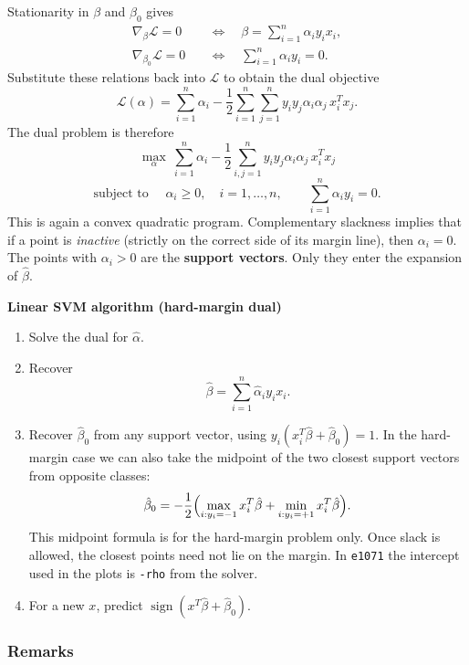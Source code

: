 \documentclass[
]{book}
\providecommand{\tightlist}{%
  \setlength{\itemsep}{0pt}\setlength{\parskip}{0pt}}
\begin{document}
Stationarity in \(\beta\) and \(\beta_0\) gives
\begin{align*}
\nabla_{\beta}\mathcal{L}=0
&\quad\Leftrightarrow\quad
\beta = \sum_{i=1}^{n}\alpha_i y_i x_i,\\
\nabla_{\beta_0}\mathcal{L}=0
&\quad\Leftrightarrow\quad
\sum_{i=1}^{n}\alpha_i y_i = 0.
\end{align*}
Substitute these relations back into \(\mathcal{L}\) to obtain the dual objective
\[
\mathcal{L}(\alpha)
= \sum_{i=1}^{n}\alpha_i
- \frac12\sum_{i=1}^{n}\sum_{j=1}^{n} y_i y_j\alpha_i\alpha_j\, x_i^T x_j.
\]
The dual problem is therefore
\[
\max_{\alpha}\
\sum_{i=1}^{n}\alpha_i
- \frac12\sum_{i,j=1}^{n} y_i y_j\alpha_i\alpha_j\, x_i^T x_j
\]
\[
\text{subject to }\quad
\alpha_i\ge 0,\quad i=1,\ldots,n,
\qquad
\sum_{i=1}^{n}\alpha_i y_i=0.
\]
This is again a convex quadratic program. Complementary slackness implies that if a point is \emph{inactive} (strictly on the correct side of its margin line), then \(\alpha_i=0\). The points with \(\alpha_i>0\) are the \textbf{support vectors}. Only they enter the expansion of \(\hat\beta\).

\textbf{Linear SVM algorithm (hard-margin dual)}

\begin{enumerate}
\def\labelenumi{\arabic{enumi}.}
\tightlist
\item
  Solve the dual for \(\hat\alpha\).
\item
  Recover
  \[
  \hat\beta = \sum_{i=1}^{n}\hat\alpha_i y_i x_i.
  \]
\item
  Recover \(\hat\beta_0\) from any support vector, using \(y_i(x_i^T\hat\beta+\hat\beta_0)=1\). In the hard-margin case we can also take the midpoint of the two closest support vectors from opposite classes:
  \[
  \hat\beta_0
  = -\frac12
  \Bigl(
    \max_{i:y_i=-1} x_i^T\hat\beta
    + \min_{i:y_i=+1} x_i^T\hat\beta
  \Bigr).
  \]
  This midpoint formula is for the hard-margin problem only. Once slack is allowed, the closest points need not lie on the margin. In \texttt{e1071} the intercept used in the plots is \texttt{-rho} from the solver.
\item
  For a new \(x\), predict \(\operatorname{sign}(x^T\hat\beta+\hat\beta_0)\).
\end{enumerate}

\subsubsection*{Remarks}\label{remarks}
\end{document}
